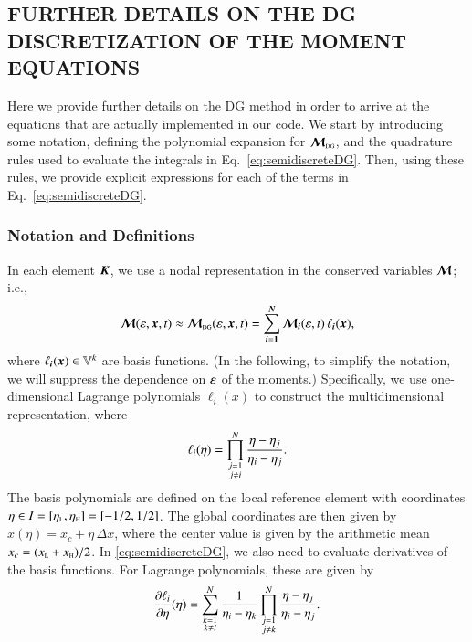 \documentclass[11pt,letterpaper,twoside,english,final]{article}
\begin{document}
\subsection{FURTHER DETAILS ON THE DG DISCRETIZATION OF THE MOMENT EQUATIONS}

Here we provide further details on the DG method in order to arrive at the equations that are actually implemented in our code.  
We start by introducing some notation, defining the polynomial expansion for $\boldsymbol{\mathcal{M}}_{\mbox{\tiny DG}}$, and the quadrature rules used to evaluate the integrals in Eq.~\eqref{eq:semidiscreteDG}.  
Then, using these rules, we provide explicit expressions for each of the terms in Eq.~\eqref{eq:semidiscreteDG}.  

\subsubsection{Notation and Definitions}

In each element $\boldsymbol{K}$, we use a nodal representation in the conserved variables $\boldsymbol{\mathcal{M}}$; i.e.,
\begin{equation}
  \boldsymbol{\mathcal{M}}(\varepsilon,\boldsymbol{x},t)\approx
  \boldsymbol{\mathcal{M}}_{\mbox{\tiny DG}}(\varepsilon,\boldsymbol{x},t)=\sum_{\boldsymbol{i}=\boldsymbol{1}}^{\boldsymbol{N}}\boldsymbol{\mathcal{M}}_{\boldsymbol{i}}(\varepsilon,t)\,\ell_{\boldsymbol{i}}(\boldsymbol{x}),
  \label{eq:conservedNodalExpansion}
\end{equation}
where $\ell_{\boldsymbol{i}}(\boldsymbol{x})\in\mathbb{V}^{k}$ are basis functions.  
(In the following, to simplify the notation, we will suppress the dependence on $\varepsilon$ of the moments.)
Specifically, we use one-dimensional Lagrange polynomials $\ell_{i}(x)$ to construct the multidimensional representation, where
\begin{equation}
  \ell_{i}(\eta)=
  \prod_{\substack{j=1\\j\ne i}}^{N}\frac{\eta-\eta_{j}}{\eta_{i}-\eta_{j}}.  
\end{equation}
The basis polynomials are defined on the local reference element with coordinates $\eta\in I=[\eta_{\mbox{\tiny L}},\eta_{\mbox{\tiny H}}]=[-1/2,1/2]$.  
The global coordinates are then given by $x(\eta)=x_{c}+\eta\,\Delta x$, where the center value is given by the arithmetic mean $x_{c}=(x_{\mbox{\tiny L}}+x_{\mbox{\tiny H}})/2$.  
In \eqref{eq:semidiscreteDG}, we also need to evaluate derivatives of the basis functions.  
For Lagrange polynomials, these are given by
\begin{equation}
  \frac{\partial \ell_{i}}{\partial \eta}(\eta)
  =\sum_{\substack{k = 1 \\ k \ne i}}^{N}\frac{1}{\eta_{i}-\eta_{k}}
  \prod_{\substack{j=1 \\ j \ne k}}^{N}\frac{\eta-\eta_{j}}{\eta_{i}-\eta_{j}}.  
\end{equation}
\end{document}
